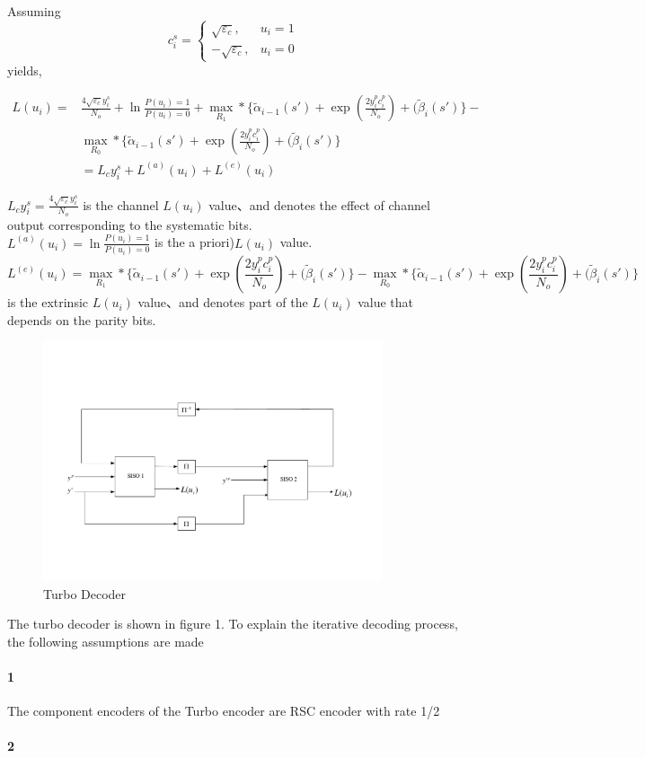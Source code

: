 \documentclass[20 pts]{article}
\begin{document}
Assuming
\[
    c_i^s= 
\begin{cases}
   \sqrt{\varepsilon_c},& u_i= 1\\        -\sqrt{\varepsilon_c},              & u_i= 0
\end{cases}
\]
yields,

\begin{equation}
\begin{split}
L(u_i)=&\frac{4\sqrt{\varepsilon_c}y_i^s}{N_o}+\ln\frac{P(u_i)=1}{P(u_i)=0}+\max_{R_1}*\Big\{\widetilde{\alpha}_{i-1}(s')+\exp(\frac{2y_i^pc_i^p}{N_o})+(\widetilde{\beta}_{i}(s')\Big\}-\\&\max_{R_0}*\Big\{\widetilde{\alpha}_{i-1}(s')+\exp(\frac{2y_i^pc_i^p}{N_o})+(\widetilde{\beta}_{i}(s')\Big\}\\
&=L_cy_i^s+L^{(a)}(u_i)+L^{(e)}(u_i)
\end{split}
\end{equation}


$L_cy_i^s=\frac{4\sqrt{\varepsilon_c}y_i^s}{N_o}$  is the channel $L(u_i)$ value、and denotes the effect of channel output corresponding to the systematic bits.\\
$L^{(a)}(u_i)=\ln\frac{P(u_i)=1}{P(u_i)=0}$ is the a priori)$ L(u_i)$ value.\\
$$L^{(e)}(u_i)=\max_{R_1}*\Big\{\widetilde{\alpha}_{i-1}(s')+\exp(\frac{2y_i^pc_i^p}{N_o})+(\widetilde{\beta}_{i}(s')\Big\}-\max_{R_0}*\Big\{\widetilde{\alpha}_{i-1}(s')+\exp(\frac{2y_i^pc_i^p}{N_o})+(\widetilde{\beta}_{i}(s')\Big\}$$ is the extrinsic $L(u_i)$ value、and denotes part of the $L(u_i)$ value that depends on the parity bits. 

\begin{figure}[h]
\includegraphics[width=10cm]{D1.pdf}
\caption{Turbo Decoder}
\label{図2}
\end{figure}%
The turbo decoder is shown in figure 1.
To explain the iterative decoding process, the following assumptions are made\paragraph{1}
The component encoders of the Turbo encoder are RSC encoder with rate 1/2\paragraph{2}
\end{document}
